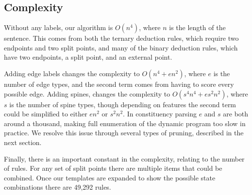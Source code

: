 \subsection{Complexity}

Without any labels, our algorithm is $O(n^4)$, where $n$ is the length of the sentence.
This comes from both the ternary deduction rules, which require two endpoints and two split points, and many of the binary deduction rules, which have two endpoints, a split point, and an external point.

Adding edge labels changes the complexity to $O(n^4 + e n^2)$, where $e$ is the number of edge types, and the second term comes from having to score every possible edge.
Adding spines, changes the complexity to $O(s^4 n^4 + e s^2 n^2)$, where $s$ is the number of spine types, though depending on features the second term could be simplified to either $e n^2$ or $s^2 n^2$.
In constituency parsing $e$ and $s$ are both around a thousand, making full enumeration of the dynamic program too slow in practice.
We resolve this issue through several types of pruning, described in the next section.

Finally, there is an important constant in the complexity, relating to the number of rules.
For any set of split points there are multiple items that could be combined.
Once our templates are expanded to show the possible state combinations there are 49,292 rules.

